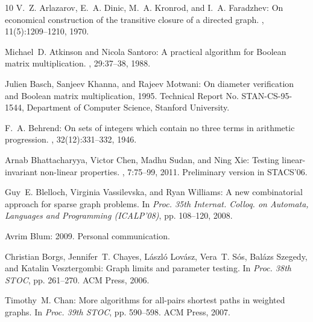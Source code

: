 \begin{thebibliography}{10}
{\sc V.~Z. Arlazarov, E.~A. Dinic, M.~A. Kronrod, and I.~A. Faradzhev}: On
  economical construction of the transitive closure of a directed graph.
, 11(5):1209--1210, 1970.

{\sc Michael~D. Atkinson and Nicola Santoro}: A practical algorithm for
  {B}oolean matrix multiplication.
, 29:37--38, 1988.
\newblock [\epfmtdoi{10.1016/0020-0190(88)90130-5}]

{\sc Julien Basch, Sanjeev Khanna, and Rajeev Motwani}: On diameter
  verification and {B}oolean matrix multiplication, 1995.
\newblock Technical Report No. STAN-CS-95-1544, Department of Computer Science,
  Stanford University.

{\sc F.~A. Behrend}: On sets of integers which contain no three terms in
  arithmetic progression.
, 32(12):331--332, 1946.

{\sc Arnab Bhattacharyya, Victor Chen, Madhu Sudan, and Ning Xie}: Testing
  linear-invariant non-linear properties.
, 7:75--99, 2011.
\newblock Preliminary version in STACS'06.

{\sc Guy~E. Blelloch, Virginia Vassilevska, and Ryan Williams}: A new
  combinatorial approach for sparse graph problems.
\newblock In {\em Proc. 35th Internat. Colloq. on Automata, Languages and
  Programming (ICALP'08)}, pp. 108--120, 2008.
\newblock [\epfmtdoi{10.1007/978-3-540-70575-8\_10}]

{\sc Avrim Blum}: 2009.
\newblock Personal communication.

{\sc Christian Borgs, Jennifer~T. Chayes, L{\'a}szl{\'o} Lov{\'a}sz, Vera~T.
  S{\'o}s, Bal{\'a}zs Szegedy, and Katalin Vesztergombi}: Graph limits and
  parameter testing.
\newblock In {\em Proc. 38th STOC}, pp. 261--270. ACM Press, 2006.
\newblock [\epfmtdoi{10.1145/1132516.1132556}]

{\sc Timothy~M. Chan}: More algorithms for all-pairs shortest paths in weighted
  graphs.
\newblock In {\em Proc. 39th STOC}, pp. 590--598. ACM Press, 2007.
\newblock [\epfmtdoi{10.1145/1250790.1250877}]


\end{thebibliography}
